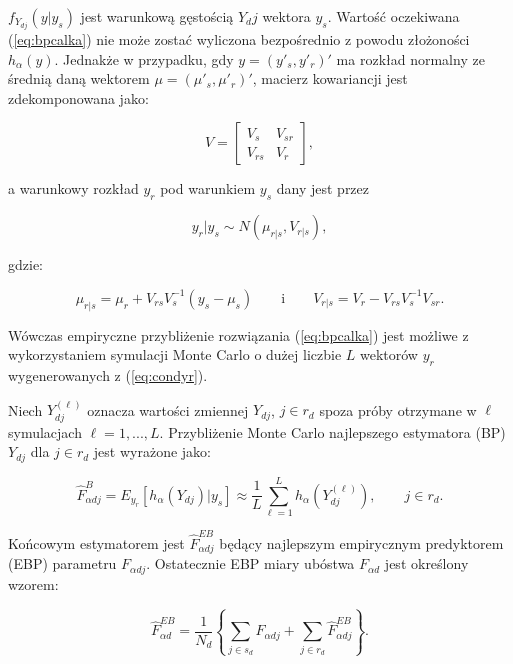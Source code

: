 $f_{Y_{dj}}(y|y_s)$ jest warunkową gęstością $Y_dj$ wektora $y_s$. Wartość oczekiwana (\ref{eq:bpcalka}) nie może zostać wyliczona bezpośrednio z powodu złożoności $h_{\alpha}(y)$. Jednakże w przypadku, gdy $y=(y'_s,y'_r)'$ ma rozkład normalny ze średnią daną wektorem $\mu=(\mu'_s,\mu'_r)'$, macierz kowariancji jest zdekomponowana jako:

\begin{equation}
V=
\begin{bmatrix}
V_s & V_{sr}\\
V_{rs} & V_r
\end{bmatrix},
\end{equation}

a warunkowy rozkład $y_r$ pod warunkiem $y_s$ dany jest przez

\begin{equation}
y_r|y_s \sim N(\mu_{r|s},V_{r|s}),
\label{eq:condyr}
\end{equation}

gdzie:

\begin{equation}
\mu_{r|s}=\mu_r+V_{rs}V_{s}^{-1}(y_s-\mu_s) \qquad \text{i} \qquad V_{r|s}=V_r-V_{rs}V_s^{-1}V_{sr}.
\label{eq:distyr}
\end{equation}

Wówczas empiryczne przybliżenie rozwiązania (\ref{eq:bpcalka}) jest możliwe z wykorzystaniem symulacji Monte Carlo o dużej liczbie $L$ wektorów $y_r$ wygenerowanych z (\ref{eq:condyr}).

Niech $Y_{dj}^{(\ell)}$ oznacza wartości zmiennej $Y_{dj}$, $j\in r_d$ spoza próby otrzymane w $\ell$ symulacjach $\ell=1,...,L$. Przybliżenie Monte Carlo najlepszego estymatora (BP) $Y_{dj}$ dla $j \in r_d$ jest wyrażone jako:

\begin{equation}
\hat{F}^{B}_{\alpha d j}=E_{y_{r}}[h_{\alpha}(Y_{dj})|y_s]\approx \frac{1}{L}\sum\limits_{\ell=1}^{L}{h_{\alpha}(Y_{dj}^{(\ell)})}, \qquad j \in r_d.
\label{eq:bpmc}
\end{equation}

Końcowym estymatorem jest $\hat{F}_{\alpha d j}^{EB}$ będący najlepszym empirycznym predyktorem (EBP) parametru $F_{\alpha d j}$. Ostatecznie EBP miary ubóstwa $F_{\alpha d}$ jest określony wzorem:

\begin{equation}
\hat{F}^{EB}_{\alpha d}=\frac{1}{N_d}\left\{\sum\limits_{j \in s_d}{F_{\alpha dj}}+\sum\limits_{j \in r_d}{\hat{F}^{EB}_{\alpha dj}}\right\}.
\label{eq:ebp}
\end{equation}

